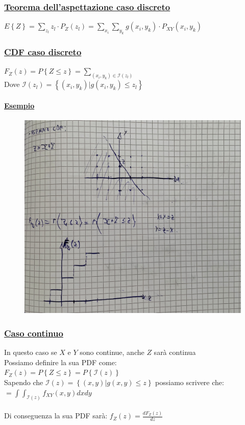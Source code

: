 \documentclass{article}
\begin{document}
\subsubsection{\underline{Teorema dell’aspettazione caso discreto}}
$E\left\{ Z \right\} = \sum_{z_l} z_l \cdot P_Z(z_l) = \sum_{x_i}\sum_{y_k} g(x_i,y_k) \cdot P_{XY}(x_i,y_k)$
\subsubsection{\underline{CDF caso discreto}}
$F_Z(z) = P\left\{ Z \leq z \right\} = \sum_{(x_i,y_k) \in \mathcal{I}(z_l)}$ \\
Dove $\mathcal{I}(z_l) = \left\{ (x_i,y_k) | g(x_i,y_k) \leq z_l \right\} $
\paragraph{\underline{Esempio}}
\begin{figure}[H]
\centering
\includegraphics[scale=0.14]{ese/46.jpeg}
\end{figure} 
\subsubsection{\underline{Caso continuo}}
In questo caso se $X$ e $Y$ sono continue, anche $Z$ sarà continua \\
Possiamo definire la sua PDF come: \\
$F_Z(z) = P \left\{ Z \leq z \right\} = P\left\{ \mathcal{I}(z) \right\}$ \\
Sapendo che $\mathcal{I}(z) = \left\{ (x,y) | g(x,y) \leq z \right\}$ possiamo scrivere che: \\
$= \int \int_{\mathcal{I}(z)} f_{XY}(x,y) dx dy$ \\ \\
Di conseguenza la sua PDF sarà: $f_Z(z) = \frac{dF_Z(z)}{dz}$ 
\end{document}
